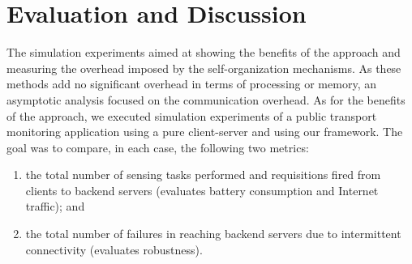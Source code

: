

\section{Evaluation and Discussion}\label{sec:evaluation}



The simulation experiments aimed at showing the benefits of the approach and measuring the overhead imposed by the self-organization mechanisms.
As these methods add no significant overhead in terms of processing or memory, an asymptotic analysis focused on the communication overhead.
As for the benefits of the approach, we executed simulation experiments of a public transport monitoring application using a pure client-server and using our framework. The goal was to compare, in each case, the following two metrics:

\begin{enumerate}[label=\textbf{M}\arabic*:]
	
	\item the total number of sensing tasks performed and requisitions fired from clients to backend servers (evaluates battery consumption and Internet traffic); and
	
	\item the total number of failures in reaching backend servers due to intermittent connectivity (evaluates robustness).
	
\end{enumerate}


%	
%	
%	


